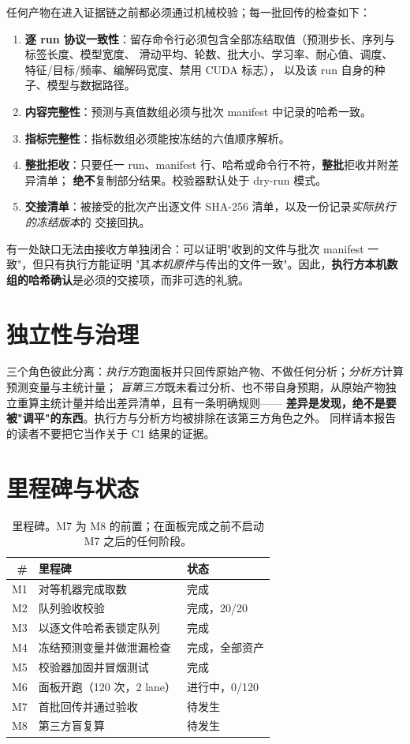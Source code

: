 \documentclass[conference]{IEEEtran}
\begin{document}
任何产物在进入证据链之前都必须通过机械校验；每一批回传的检查如下：

\begin{enumerate}
\item \textbf{逐 run 协议一致性}：留存命令行必须包含全部冻结取值（预测步长、序列与标签长度、模型宽度、
滑动平均、轮数、批大小、学习率、耐心值、调度、特征/目标/频率、编解码宽度、禁用 CUDA 标志），
以及该 run 自身的种子、模型与数据路径。
\item \textbf{内容完整性}：预测与真值数组必须与批次 manifest 中记录的哈希一致。
\item \textbf{指标完整性}：指标数组必须能按冻结的六值顺序解析。
\item \textbf{整批拒收}：只要任一 run、manifest 行、哈希或命令行不符，\textbf{整批}拒收并附差异清单；
\textbf{绝不}复制部分结果。校验器默认处于 dry-run 模式。
\item \textbf{交接清单}：被接受的批次产出逐文件 SHA-256 清单，以及一份记录\emph{实际执行的冻结版本}的
交接回执。
\end{enumerate}

有一处缺口无法由接收方单独闭合：可以证明"收到的文件与批次 manifest 一致"，但只有执行方能证明
"其\emph{本机原件}与传出的文件一致"。因此，\textbf{执行方本机数组的哈希确认}是必须的交接项，而非可选的礼貌。

\section{独立性与治理}
\label{sec:gov}

三个角色彼此分离：\emph{执行方}跑面板并只回传原始产物、不做任何分析；\emph{分析方}计算预测变量与主统计量；
\emph{盲第三方}既未看过分析、也不带自身预期，从原始产物独立重算主统计量并给出差异清单，且有一条明确规则——
\textbf{差异是发现，绝不是要被"调平"的东西}。执行方与分析方均被排除在该第三方角色之外。
同样请本报告的读者不要把它当作关于 C1 结果的证据。

\section{里程碑与状态}
\label{sec:mil}

\begin{table}[!t]
\centering
\small
\begin{tabular}{@{}rlp{}@{}}
\toprule
\# & 里程碑 & 状态 \\
\midrule
M1 & 对等机器完成取数 & 完成 \\
M2 & 队列验收校验 & 完成，20/20 \\
M3 & 以逐文件哈希表锁定队列 & 完成 \\
M4 & 冻结预测变量并做泄漏检查 & 完成，全部资产 \\
M5 & 校验器加固并冒烟测试 & 完成 \\
M6 & 面板开跑（120 次，2 lane） & 进行中，0/120 \\
M7 & 首批回传并通过验收 & 待发生 \\
M8 & 第三方盲复算 & 待发生 \\
\bottomrule
\end{tabular}
\caption{里程碑。M7 为 M8 的前置；在面板完成之前不启动 M7 之后的任何阶段。}
\label{tab:mil}
\end{table}
\end{document}

